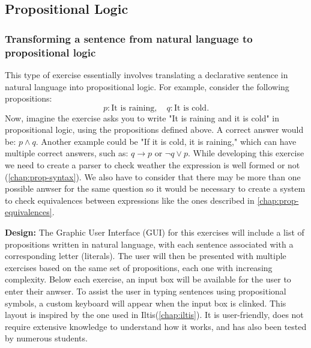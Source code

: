 \subsection{Propositional Logic}

\subsubsection{Transforming a sentence from natural language to propositional logic}
This type of exercise essentially involves translating a declarative sentence in natural language into propositional logic. For example, consider the following propositions:
\[
p: \text{It is raining}, \quad q: \text{It is cold}.
\]
Now, imagine the exercise asks you to write "It is raining and it is cold" in propositional logic, using the propositions defined above. A correct answer would be: \(p \land q\). Another example could be "If it is cold, it is raining," which can have multiple correct answers, such as: \(q \rightarrow p\) or \(\neg q \lor p\). While developing this exercise we need to create a parser to check weather the expression is well formed or not (\ref{chap:prop-syntax}). We also have to consider that there may be more than one possible anwser for the same question so it would be necessary to create a system to check equivalences between expressions like the ones described in \ref{chap:prop-equivalences}. 


\textbf{Design: } The Graphic User Interface (GUI) for this exercises will include a list of propositions written in natural language, with each sentence associated with a corresponding letter (literals). The user will then be presented with multiple exercises based on the same set of propositions, each one with increasing complexity. Below each exercise, an input box will be available for the user to enter their anwser. To assist the user in typing sentences using propositional symbols, a custom keyboard will appear when the input box is clinked. This layout is inspired by the one used in Iltis(\ref{chap:iltis}). It is user-friendly, does not require extensive knowledge to understand how it works, and has also been tested by numerous students. 


